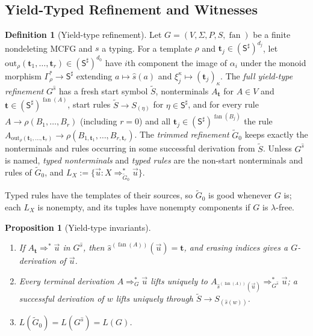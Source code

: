 \documentclass[11pt]{article}
\numberwithin{equation}{section}
\theoremstyle{plain}
\newtheorem{proposition}[theorem]{Proposition}
\theoremstyle{definition}
\newtheorem{definition}[theorem]{Definition}
\theoremstyle{remark}
\newcommand{\out}{\mathrm{out}}
\newcommand{\tuple}[1]{\vec{#1}}
\newcommand{\fan}{\operatorname{fan}}
\begin{document}
\subsection{Yield-Typed Refinement and Witnesses}
\label{sec:refinement}

\begin{definition}[Yield-type refinement]
\label{def:output-refinement}
Let $G=(V,\Sigma,P,S,\fan)$ be a finite nondeleting MCFG and $s$ a typing.
For a template $\rho$ and $\mathbf t_j\in(\mathsf S^\sharp)^{d_j}$, let
$\out_\rho(\mathbf t_1,\ldots,\mathbf t_r)\in(\mathsf S^\sharp)^{d_0}$ have
$i$th component the image of $\alpha_i$ under the monoid morphism
$\Gamma_\rho^*\to\mathsf S^\sharp$ extending $a\mapsto\widehat{s}(a)$ and
$\xi_j^\kappa\mapsto(\mathbf t_j)_\kappa$.  The \emph{full yield-type
refinement} $G^{\widehat{s}}$ has a fresh start symbol $\widetilde S$,
nonterminals $A_{\mathbf t}$ for $A\in V$ and
$\mathbf t\in(\mathsf S^\sharp)^{\fan(A)}$, start rules
$\widetilde S\to S_{(\eta)}$ for $\eta\in\mathsf S^\sharp$, and for every rule
$A\to\rho(B_1,\ldots,B_r)$ (including $r=0$) and all
$\mathbf t_j\in(\mathsf S^\sharp)^{\fan(B_j)}$ the rule
$A_{\out_\rho(\mathbf t_1,\ldots,\mathbf t_r)}\to
\rho(B_{1,\mathbf t_1},\ldots,B_{r,\mathbf t_r})$.  The \emph{trimmed
refinement} $\widetilde G_0$ keeps exactly the nonterminals and rules occurring
in some successful derivation from $\widetilde S$.  Unless $G^{\widehat{s}}$ is
named, \emph{typed nonterminals} and \emph{typed rules} are the non-start
nonterminals and rules of $\widetilde G_0$, and
$L_X:=\{\tuple u:X\Rightarrow_{\widetilde G_0}^*\tuple u\}$.
\end{definition}

Typed rules have the templates of their sources, so $\widetilde G_0$ is good
whenever $G$ is; each $L_X$ is nonempty, and its tuples have nonempty
components if $G$ is $\lambda$-free.

\begin{proposition}[Yield-type invariants]
\label{prop:output-invariants}
\begin{enumerate}[label=(\roman*),leftmargin=*]
\item If $A_{\mathbf t}\Rightarrow^*\tuple u$ in $G^{\widehat{s}}$, then
$\widehat{s}^{(\fan(A))}(\tuple u)=\mathbf t$, and erasing indices gives a
$G$-derivation of $\tuple u$.
\item Every terminal derivation $A\Rightarrow_G^*\tuple u$ lifts uniquely to
$A_{\widehat{s}^{(\fan(A))}(\tuple u)}\Rightarrow_{G^{\widehat{s}}}^*\tuple u$; a successful
derivation of $w$ lifts uniquely through $\widetilde S\to S_{(\widehat{s}(w))}$.
\item $L(\widetilde G_0)=L(G^{\widehat{s}})=L(G)$.
\end{enumerate}
\end{proposition}
\end{document}
